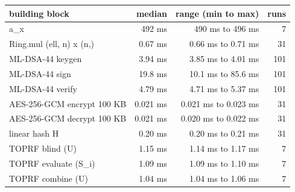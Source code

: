 \begin{tabular}{lrrr}
\toprule
\textbf{building block} & \textbf{median} & \textbf{range (min to max)} & \textbf{runs} \\
\midrule
a\_x & 492 ms & 490 ms to 496 ms & 7 \\
Ring.mul (ell, n) x (n,) & 0.67 ms & 0.66 ms to 0.71 ms & 31 \\
ML-DSA-44 keygen & 3.94 ms & 3.85 ms to 4.01 ms & 101 \\
ML-DSA-44 sign & 19.8 ms & 10.1 ms to 85.6 ms & 101 \\
ML-DSA-44 verify & 4.79 ms & 4.71 ms to 5.37 ms & 101 \\
AES-256-GCM encrypt 100 KB & 0.021 ms & 0.021 ms to 0.023 ms & 31 \\
AES-256-GCM decrypt 100 KB & 0.021 ms & 0.020 ms to 0.022 ms & 31 \\
linear hash H & 0.20 ms & 0.20 ms to 0.21 ms & 31 \\
TOPRF blind (U) & 1.15 ms & 1.14 ms to 1.17 ms & 7 \\
TOPRF evaluate (S\_i) & 1.09 ms & 1.09 ms to 1.10 ms & 7 \\
TOPRF combine (U) & 1.04 ms & 1.04 ms to 1.06 ms & 7 \\
\bottomrule
\end{tabular}
